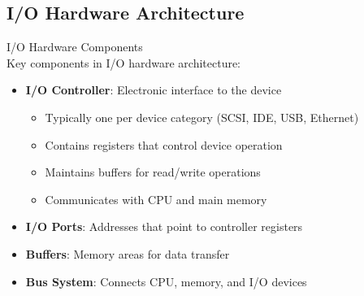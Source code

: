 \subsection{I/O Hardware Architecture}

\begin{definition}{I/O Hardware Components}\\
    Key components in I/O hardware architecture:
    \begin{itemize}
        \item \textbf{I/O Controller}: Electronic interface to the device
            \begin{itemize}
                \item Typically one per device category (SCSI, IDE, USB, Ethernet)
                \item Contains registers that control device operation
                \item Maintains buffers for read/write operations
                \item Communicates with CPU and main memory
            \end{itemize}
        \item \textbf{I/O Ports}: Addresses that point to controller registers
        \item \textbf{Buffers}: Memory areas for data transfer
        \item \textbf{Bus System}: Connects CPU, memory, and I/O devices
    \end{itemize}
\end{definition}


